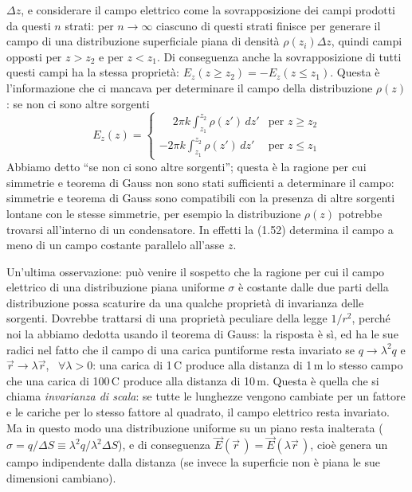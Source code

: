 \begin{enumerate}
    $\Delta z$, e considerare il campo elettrico come la sovrapposizione dei
    campi prodotti da questi $n$ strati: per $n\to\infty$ ciascuno di questi
    strati finisce per generare il campo di una distribuzione superficiale piana
    di densit\`a $\rho(z_i)\Delta z$, quindi campi opposti per $z>z_2$ e per
    $z<z_1$. Di conseguenza anche la sovrapposizione di tutti questi campi ha la
    stessa propriet\`a: $E_z(z\ge z_2)=-E_z(z\le z_1)$. Questa \`e
    l'informazione che ci mancava per determinare il campo della distribuzione
    $\rho(z)$: se non ci sono altre sorgenti
    \begin{equation}
      E_z(z)=\begin{cases}
        \phantom{-}2\pi k\displaystyle\int_{z_1}^{z_2}\rho(z')\,dz'
        &\text{per }z\ge z_2\\[12pt]
        -2\pi k\displaystyle\int_{z_1}^{z_2}\rho(z')\,dz'&\text{per }z\le z_1
      \end{cases}
      \tag{1.57}
    \end{equation}
    Abbiamo detto ``se non ci sono altre sorgenti''; questa \`e la ragione per
    cui simmetrie e teorema di Gauss non sono stati sufficienti a determinare il
    campo: simmetrie e teorema di Gauss sono compatibili con la presenza di
    altre sorgenti lontane con le stesse simmetrie, per esempio la distribuzione
    $\rho(z)$ potrebbe trovarsi all'interno di un condensatore. In effetti la
    (1.52) determina il campo a meno di un campo costante parallelo all'asse
    $z$.
\end{enumerate}
Un'ultima osservazione: pu\`o venire il sospetto che la ragione per cui il campo
elettrico di una distribuzione piana uniforme $\sigma$ \`e costante dalle due
parti della distribuzione possa scaturire da una qualche propriet\`a di
invarianza delle sorgenti. Dovrebbe trattarsi di una propriet\`a peculiare della
legge $1/r^2$, perch\'e noi la abbiamo dedotta usando il teorema di Gauss: la
risposta \`e s\`i, ed ha le sue radici nel fatto che il campo di una carica
puntiforme resta invariato se $q\to\lambda^2q$ e $\vec r\to\lambda\vec r$,
\ $\forall\lambda>0$: una carica di 1\,C produce alla distanza di 1\,m lo stesso
campo che una carica di 100\,C produce alla distanza di 10\,m. Questa \`e quella
che si chiama \emph{invarianza di scala}: se tutte le lunghezze vengono cambiate
per un fattore e le cariche per lo stesso fattore al quadrato, il campo
elettrico resta invariato. Ma in questo modo una distribuzione uniforme su un
piano resta inalterata ($\sigma=q/\Delta S\equiv\lambda^2q/\lambda^2\Delta S$),
e di conseguenza $\vec E(\vec r\,)=\vec E(\lambda\vec r\,)$, cio\`e genera un
campo indipendente dalla distanza (se invece la superficie non \`e piana le sue
dimensioni cambiano).

